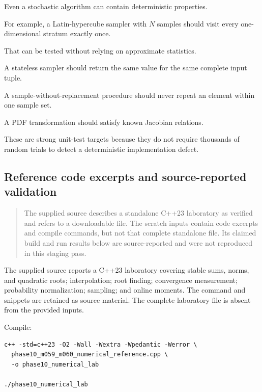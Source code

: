 \hypertarget{02-foundations-ii-ch031-deterministic-tests-of-randomized-code}{}

Even a stochastic algorithm can contain deterministic properties.

For example, a Latin-hypercube sampler with \(N\) samples should visit every one-dimensional stratum exactly once.

That can be tested without relying on approximate statistics.

A stateless sampler should return the same value for the same complete input tuple.

A sample-without-replacement procedure should never repeat an element within one sample set.

A PDF transformation should satisfy known Jacobian relations.

These are strong unit-test targets because they do not require thousands of random trials to detect a deterministic implementation defect.

\subsection{Reference code excerpts and source-reported validation}\label{02-foundations-ii-ch031-reference-code-excerpts-and-source-reported-validation}

\hypertarget{02-foundations-ii-ch031-reference-code-excerpts-and-source-reported-validation}{}

\begin{quote}
The supplied source describes a standalone C++23 laboratory as verified and refers to a downloadable  file. The scratch inputs contain code excerpts and compile commands, but not that complete standalone file. Its claimed build and run results below are source-reported and were not reproduced in this staging pass.
\end{quote}

The supplied source reports a C++23 laboratory covering stable sums, norms, and quadratic roots; interpolation; root finding; convergence measurement; probability normalization; sampling; and online moments. The command and snippets are retained as source material. The complete laboratory file is absent from the provided inputs.

Compile:

\begin{verbatim}
c++ -std=c++23 -O2 -Wall -Wextra -Wpedantic -Werror \
  phase10_m059_m060_numerical_reference.cpp \
  -o phase10_numerical_lab

./phase10_numerical_lab
\end{verbatim}

